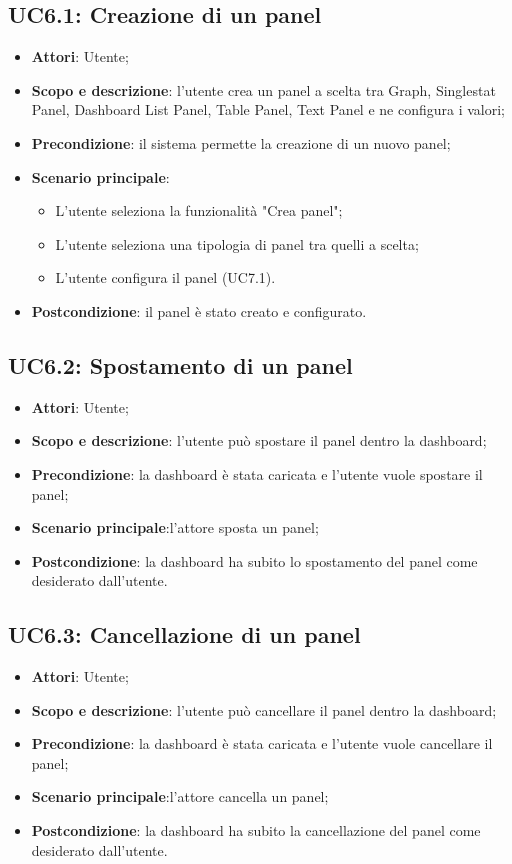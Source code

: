 \subsection{UC6.1: Creazione di un panel}
\hypertarget{UC6.1}{}
\begin{itemize}
	\item \textbf{Attori}: Utente;
	\item \textbf{Scopo e descrizione}: l'utente crea un panel a scelta tra Graph, Singlestat Panel, Dashboard List Panel, Table Panel, Text Panel e ne configura i valori;
	\item \textbf{Precondizione}: il sistema permette la creazione di un nuovo panel;
	\item \textbf{Scenario principale}:
	\begin{itemize}
		\item L'utente seleziona la funzionalità "Crea panel";
		\item L'utente seleziona una tipologia di panel tra quelli a scelta;
		\item L'utente configura il panel (UC7.1).
	\end{itemize}
	\item \textbf{Postcondizione}: il panel è stato creato e configurato.
\end{itemize}
\subsection{UC6.2: Spostamento di un panel}
\hypertarget{UC6.2}{}
\begin{itemize}
	\item \textbf{Attori}: Utente;
	\item \textbf{Scopo e descrizione}: l'utente può spostare il panel dentro la dashboard;
	\item \textbf{Precondizione}: la dashboard è stata caricata e l'utente vuole spostare il panel;
	\item \textbf{Scenario principale}:l'attore sposta un panel;
	\item \textbf{Postcondizione}: la dashboard ha subito lo spostamento del panel come desiderato dall'utente.
\end{itemize}
\subsection{UC6.3: Cancellazione di un panel}
\hypertarget{UC6.3}{}
\begin{itemize}
	\item \textbf{Attori}: Utente;
	\item \textbf{Scopo e descrizione}: l'utente può cancellare il panel dentro la dashboard;
	\item \textbf{Precondizione}: la dashboard è stata caricata e l'utente vuole cancellare il panel;
	\item \textbf{Scenario principale}:l'attore cancella un panel;
	\item \textbf{Postcondizione}: la dashboard ha subito la cancellazione del panel come desiderato dall'utente.
\end{itemize}
